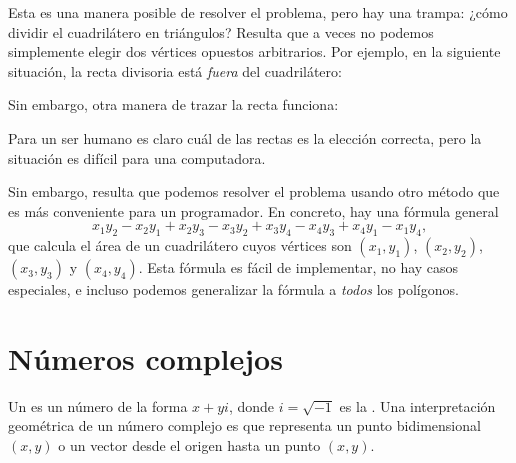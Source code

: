 Esta es una manera posible de resolver el problema,
pero hay una trampa:
¿cómo dividir el cuadrilátero en triángulos?
Resulta que a veces no podemos simplemente elegir
dos vértices opuestos arbitrarios.
Por ejemplo, en la siguiente situación,
la recta divisoria está \emph{fuera} del cuadrilátero:
\begin{center}
\end{center}
Sin embargo, otra manera de trazar la recta funciona:
\begin{center}
\end{center}
Para un ser humano es claro cuál de las rectas es la elección
correcta, pero la situación es difícil para una computadora.

Sin embargo, resulta que podemos resolver el problema usando
otro método que es más conveniente para un programador.
En concreto, hay una fórmula general
\[x_1y_2-x_2y_1+x_2y_3-x_3y_2+x_3y_4-x_4y_3+x_4y_1-x_1y_4,\]
que calcula el área de un cuadrilátero
cuyos vértices son
$(x_1,y_1)$,
$(x_2,y_2)$,
$(x_3,y_3)$ y
$(x_4,y_4)$.
Esta fórmula es fácil de implementar, no hay casos
especiales, e incluso podemos generalizar la fórmula
a \emph{todos} los polígonos.

\section{Números complejos}


Un  es un número de la forma $x+y i$,
donde $i = \sqrt{-1}$ es la .
Una interpretación geométrica de un número complejo es
que representa un punto bidimensional $(x,y)$
o un vector desde el origen hasta un punto $(x,y)$.

